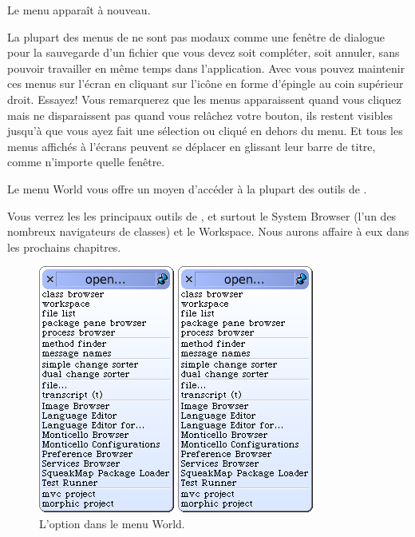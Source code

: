 \documentclass[a4paper,10pt,twoside]{book}
\begin{document}

Le menu  apparaît à nouveau.

La plupart des menus de \sq ne sont pas modaux comme une fenêtre de dialogue pour la sauvegarde d'un fichier que vous devez soit compléter, soit annuler, sans pouvoir travailler en même temps dans l'application. Avec \sq vous pouvez maintenir ces menus sur l'écran en cliquant sur l'icône en forme d'épingle au coin supérieur droit. Essayez! Vous remarquerez que les menus apparaissent  quand  vous cliquez  mais ne disparaissent pas quand vous relâchez votre bouton, ils restent visibles jusqu'à que vous ayez fait une sélection ou cliqué en dehors du menu. Et tous les menus affichés à l'écrans peuvent se déplacer en glissant leur barre de titre, comme n'importe quelle fenêtre.

Le menu World vous offre un moyen d'accéder à la plupart des outils de \sq.


Vous verrez  les les principaux outils de \sq, et surtout le System Browser (l'un des nombreux navigateurs de classes) et le Workspace. Nous aurons affaire à eux dans les prochains chapitres.

\begin{figure}[htb]
\ifluluelse
	{\centerline {\includegraphics[scale=0.5]{OpenMenu}}}
	{\centerline {\includegraphics[scale=0.7]{OpenMenu}}}
\caption{L'option   dans le menu World.\label{fig:openmenu}}
\end{figure}
\end{document}

